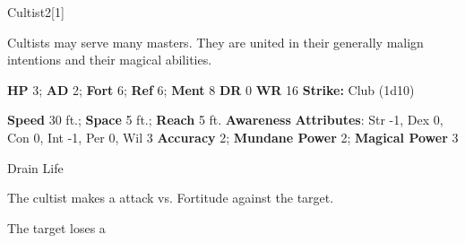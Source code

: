   \begin{monsection}{Cultist}{2}[1]
    \vspace{-1em}\vspace{-1em}
    \vspace{0em}

    
      Cultists may serve many masters.
      They are united in their generally malign intentions and their magical abilities.
    

    \begin{spellcontent}
      \begin{spelltargetinginfo}
        \pari \textbf{HP} 3;
          \textbf{AD} 2;
          \textbf{Fort} 6;
          \textbf{Ref} 6;
          \textbf{Ment} 8
        \pari \textbf{DR} 0
        \pari \textbf{WR} 16
        \pari \textbf{Strike:}
            Club  (1d10)
      \end{spelltargetinginfo}
    \end{spellcontent}
    \begin{monsterfooter}
      \pari \textbf{Speed} 30 ft.;
        \textbf{Space} 5 ft.;
        \textbf{Reach} 5 ft.
      \pari \textbf{Awareness} 
      \pari \textbf{Attributes}:
        Str -1, Dex 0,
        Con 0, Int -1,
        Per 0, Wil 3
      \pari \textbf{Accuracy} 2;
        \textbf{Mundane Power} 2;
      \textbf{Magical Power} 3
    \end{monsterfooter}
  \end{monsection}
  \begin{freeability}{Drain Life}
      
      The cultist makes a  attack
        vs. Fortitude against the target.
    
    \hit The target loses a 
    \end{freeability}
  
